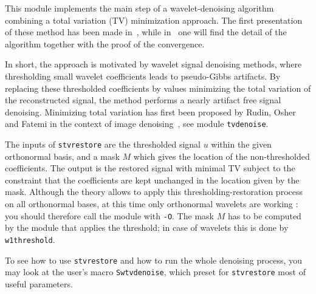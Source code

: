 This module implements the main step of a wavelet-denoising algorithm 
combining a total variation (TV)
minimization approach. The first presentation of these method has been
made in~\cite{durand.froment:artifact}, while in~\cite{durand.froment:reconstruction} one
will find the detail of the algorithm together with the proof of the convergence.

In short, the approach is motivated by wavelet signal denoising methods, where 
thresholding small wavelet coefficients leads to pseudo-Gibbs artifacts. By replacing
these thresholded coefficients by values minimizing the total variation of the
reconstructed signal, the method performs a nearly artifact free signal denoising.
Minimizing total variation has first been proposed by Rudin, Osher and Fatemi
in the context of image denoising~\cite{rudin.osher.ea:nonlinear}\cite{rudin.osher:total},
see module {\tt tvdenoise}.

The inputs of {\tt stvrestore} are the thresholded signal $u$ within the given orthonormal
basis, and a mask $M$ which gives the location of the non-thresholded coefficients.
The output is the restored signal with minimal TV subject to the constraint that
the coefficients are kept unchanged in the location given by the mask.
Although the theory allows to apply this thresholding-restoration process on all
orthonormal bases, at this time only orthonormal wavelets are working : you should
therefore call the module with {\tt -O}.
The mask $M$ has to be computed by the module that applies the threshold; in case of
wavelets this is done by {\tt w1threshold}.

To see how to use {\tt stvrestore} and how to run the whole denoising process, 
you may look at the user's macro {\tt Swtvdenoise}, which preset for
{\tt stvrestore} most of useful parameters.

